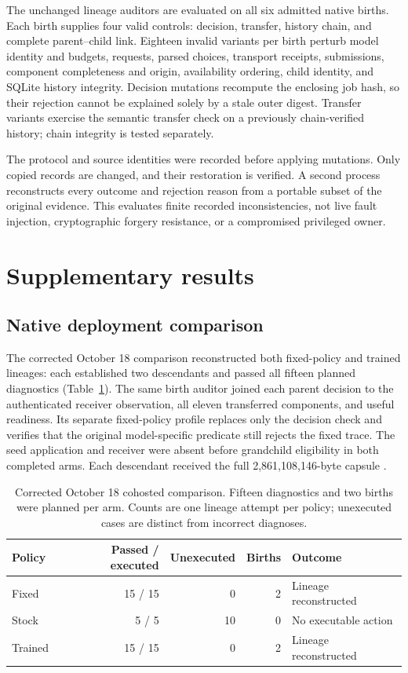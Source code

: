 \documentclass[11pt,letterpaper]{article}
\begin{document}
The unchanged lineage auditors are evaluated on all six admitted native births.
Each birth supplies four valid controls: decision, transfer, history chain, and
complete parent--child link. Eighteen invalid variants per birth perturb model
identity and budgets, requests, parsed choices, transport receipts, submissions,
component completeness and origin, availability ordering, child identity, and
SQLite history integrity. Decision mutations recompute the enclosing job hash,
so their rejection cannot be explained solely by a stale outer digest.
Transfer variants exercise the semantic transfer check on a previously
chain-verified history; chain integrity is tested separately.

The protocol and source identities were recorded before applying mutations.
Only copied records are changed, and their restoration is verified. A second
process reconstructs every outcome and rejection reason from a portable subset
of the original evidence. This evaluates finite recorded inconsistencies,
not live fault injection, cryptographic forgery resistance, or a compromised
privileged owner.

\section{Supplementary results}
\label{sec:suppresults}

\subsection{Native deployment comparison}
\label{sec:controlresults}

The corrected October 18 comparison reconstructed both fixed-policy and trained
lineages: each established two descendants and passed all fifteen planned
diagnostics (Table~\ref{tab:controls}). The same birth auditor joined each
parent decision to the authenticated receiver observation, all eleven
transferred components, and useful readiness. Its separate fixed-policy
profile replaces only the decision check and verifies that the original
model-specific predicate still rejects the fixed trace. The seed application
and receiver were absent before grandchild eligibility in both completed arms.
Each descendant received the full 2,861,108,146-byte capsule
\cite{correctedcontrols}.

\begin{table}[htbp]
\centering\small
\caption{Corrected October 18 cohosted comparison. Fifteen diagnostics and two
births were planned per arm. Counts are one lineage attempt per policy;
unexecuted cases are distinct from incorrect diagnoses.}
\label{tab:controls}
\begin{tabular}{@{}lrrrl@{}}
\toprule
Policy & Passed / executed & Unexecuted & Births & Outcome\\
\midrule
Fixed & 15 / 15 & 0 & 2 & Lineage reconstructed\\
Stock & 5 / 5 & 10 & 0 & No executable action\\
Trained & 15 / 15 & 0 & 2 & Lineage reconstructed\\
\bottomrule
\end{tabular}
\end{table}
\end{document}
